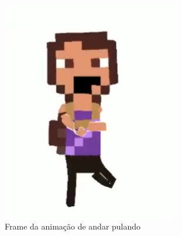\begin{figure}[htbp]
    \centering
    \caption{\small Frames das animações geradas pelo Animated Drawnings 2}
    \label{fig:sketchIrma2Frame}
    \begin{subfigure}{0.2\linewidth}
        \includegraphics[width=1\linewidth]{figs/sketchLab/irma2_frame1_andando.PNG}
        \caption{\small Frame da animação de andar pulando}
        \label{fig:sketchIrma2Frame1}
    \end{subfigure}
    \begin{subfigure}{0.2\linewidth}

\end{subfigure}
\end{figure}

